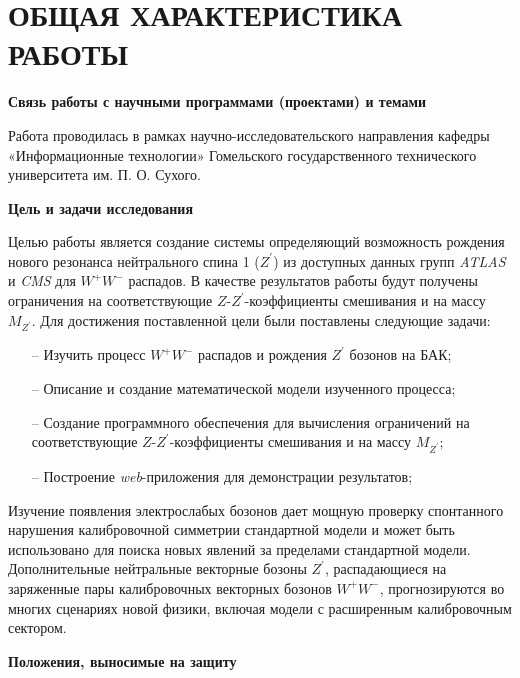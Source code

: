 \chapter*{ОБЩАЯ ХАРАКТЕРИСТИКА РАБОТЫ}
\textbf{Связь работы с научными программами (проектами) и темами}

Работа проводилась в рамках научно-исследовательского направления кафедры «Информационные технологии» Гомельского государственного технического университета им. П. О. Сухого.


\textbf{Цель и задачи исследования}

Целью работы является создание системы определяющий возможность рождения нового резонанса нейтрального спина 1 (${Z}^{\prime}$) 
из доступных данных групп \textit{ATLAS} и \textit{CMS} для ${W}^{+}{W}^{-}$ распадов. В качестве результатов работы будут получены 
ограничения на соответствующие $Z$-${Z}^{\prime}$-коэффициенты смешивания и на массу $M_{Z^\prime}$.
Для достижения поставленной цели были поставлены следующие задачи:

\begin{itemize}
	\item[--] Изучить процесс ${W}^{+}{W}^{-}$ распадов и рождения ${Z}^{\prime}$ бозонов на БАК;
	
	\item[--] Описание и создание математической модели изученного процесса;
	
	\item[--] Создание программного обеспечения для вычисления ограничений на соответствующие $Z$-${Z}^{\prime}$-коэффициенты смешивания и на массу $M_{Z^\prime}$;
	
	\item[--] Построение \textit{web}-приложения для демонстрации результатов;
	
\end{itemize}

Изучение появления электрослабых бозонов дает мощную проверку спонтанного нарушения 
калибровочной симметрии стандартной модели и может быть использовано для поиска новых явлений за пределами стандартной модели. 
Дополнительные нейтральные векторные бозоны ${Z}^{\prime}$, распадающиеся на заряженные пары калибровочных векторных бозонов ${W}^{+}{W}^{-}$, 
прогнозируются во многих сценариях новой физики, включая модели с расширенным калибровочным сектором.

\textbf{Положения, выносимые на защиту}

